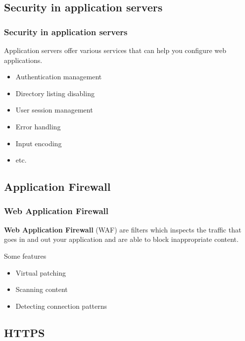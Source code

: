 \subsection{Security in application servers}

\begin{frame}
\frametitle{Security in application servers}
Application servers offer various services that can help you configure
web applications.

\begin{itemize}
\item Authentication management
\item Directory listing disabling
\item User session management
\item Error handling
\item Input encoding
\item etc.
\end{itemize}
\end{frame}

\subsection{Application Firewall}

\begin{frame}
\frametitle{Web Application Firewall}
\textbf{Web Application Firewall} (WAF) are filters which inspects the traffic
that goes in and out your application and are able to block inappropriate
content.

\begin{block}{Some features}
\begin{itemize}
\item Virtual patching
\item Scanning content
\item Detecting connection patterns
\end{itemize}
\end{block}
\end{frame}

\subsection{HTTPS}

